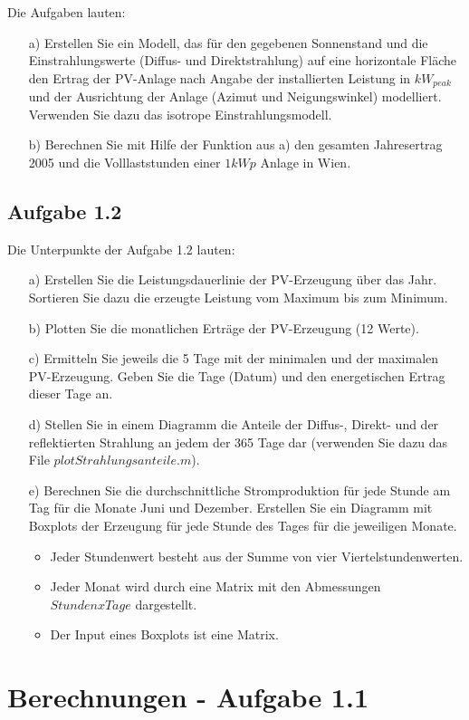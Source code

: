 \documentclass[a4paper,12pt]{article}
\begin{document}
	Die Aufgaben lauten:
	\begin{itemize}
		\item[a)] Erstellen Sie ein Modell, das für den gegebenen Sonnenstand und die Einstrahlungswerte (Diffus- und Direktstrahlung) auf eine horizontale Fläche den Ertrag der PV-Anlage nach Angabe der installierten Leistung in $kW_{peak}$ und der Ausrichtung der Anlage (Azimut und Neigungswinkel) modelliert. Verwenden Sie dazu das isotrope Einstrahlungsmodell.
		\item[b)] Berechnen Sie mit Hilfe der Funktion aus a) den gesamten Jahresertrag 2005 und die Volllaststunden einer $1kWp$ Anlage in Wien.
	\end{itemize}
	\subsection{Aufgabe 1.2}
	Die Unterpunkte der Aufgabe 1.2 lauten:
	\begin{itemize}
		\item[a)] Erstellen Sie die Leistungsdauerlinie der PV-Erzeugung über das Jahr. Sortieren Sie dazu die erzeugte Leistung vom Maximum bis zum Minimum.
		\item[b)] Plotten Sie die monatlichen Erträge der PV-Erzeugung (12 Werte).
		\item[c)] Ermitteln Sie jeweils die 5 Tage mit der minimalen und der maximalen PV-Erzeugung. Geben Sie die Tage (Datum) und den energetischen Ertrag dieser Tage an.
		\item[d)] Stellen Sie in einem Diagramm die Anteile der Diffus-, Direkt- und der reflektierten Strahlung an jedem der 365 Tage dar (verwenden Sie dazu das File $plotStrahlungsanteile.m$).
		\item[e)] Berechnen Sie die durchschnittliche Stromproduktion für jede Stunde am Tag für die Monate Juni und Dezember. Erstellen Sie ein Diagramm mit Boxplots der Erzeugung für jede Stunde des Tages für die jeweiligen Monate.
		\begin{itemize}
			\item Jeder Stundenwert besteht aus der Summe von vier Viertelstundenwerten.
			\item Jeder Monat wird durch eine Matrix mit den Abmessungen $Stunden x Tage$ dargestellt.
			\item Der Input eines Boxplots ist eine Matrix.
		\end{itemize}
	\end{itemize}
	\newpage
	\section{Berechnungen - Aufgabe 1.1}
\end{document}
